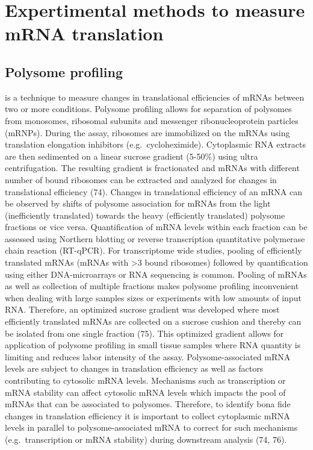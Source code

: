 \documentclass[12pt,openany]{book}
\begin{document}
\section{Expertimental methods to measure mRNA translation}\subsection{Polysome profiling}

is a technique to measure changes in translational efficiencies of mRNAs
between two or more conditions. Polysome profiling allows for separation
of polysomes from monosomes, ribosomal subunits and messenger
ribonucleoprotein particles (mRNPs). During the assay, ribosomes are
immobilized on the mRNAs using translation elongation inhibitors
(e.g.~cycloheximide). Cytoplasmic RNA extracts are then sedimented on a
linear sucrose gradient (5-50\%) using ultra centrifugation. The
resulting gradient is fractionated and mRNAs with different number of
bound ribosomes can be extracted and analyzed for changes in
translational efficiency (74). Changes in translational efficiency of an
mRNA can be observed by shifts of polysome association for mRNAs from
the light (inefficiently translated) towards the heavy (efficiently
translated) polysome fractions or vice versa. Quantification of mRNA
levels within each fraction can be assessed using Northern blotting or
reverse transcription quantitative polymerase chain reaction (RT-qPCR).
For transcriptome wide studies, pooling of efficiently translated mRNAs
(mRNAs with \textgreater{}3 bound ribosomes) followed by quantification
using either DNA-microarrays or RNA sequencing is common. Pooling of
mRNAs as well as collection of multiple fractions makes polysome
profiling inconvenient when dealing with large samples sizes or
experiments with low amounts of input RNA. Therefore, an optimized
sucrose gradient was developed where most efficiently translated mRNAs
are collected on a sucrose cushion and thereby can be isolated from one
single fraction (75). This optimized gradient allows for application of
polysome profiling in small tissue samples where RNA quantity is
limiting and reduces labor intensity of the assay. Polysome-associated
mRNA levels are subject to changes in translation efficiency as well as
factors contributing to cytosolic mRNA levels. Mechanisms such as
transcription or mRNA stability can affect cytosolic mRNA levels which
impacts the pool of mRNAs that can be associated to polysomes.
Therefore, to identify bona fide changes in translation efficiency it is
important to collect cytoplasmic mRNA levels in parallel to
polysome-associated mRNA to correct for such mechanisms
(e.g.~transcription or mRNA stability) during downstream analysis (74,
76).
\end{document}

